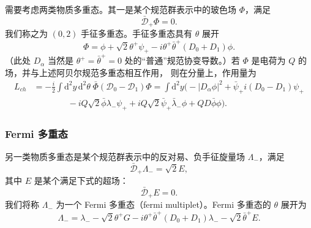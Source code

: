 需要考虑两类物质多重态。其一是某个规范群表示中的玻色场 $\Phi$，满足
\begin{equation}
\bar{\mathcal{D}}_+\Phi=0.\tag{6.10}
\end{equation}
我们称之为 $(0,2)$ 手征多重态。手征多重态具有 $\theta$ 展开
\begin{equation}
\Phi=\phi+\sqrt2\theta^+\psi_+-i\theta^+\bar\theta^+(D_0+D_1)\phi.\tag{6.11}
\end{equation}
（此处 $D_\alpha$ 当然是 $\theta^+=\bar\theta^+=0$ 处的“普通”规范协变导数。）若 $\Phi$ 是电荷为 $Q$ 的场，并与上述阿贝尔规范多重态相互作用，
\label{op:78}
则在分量上，作用量为
\begin{equation}
\begin{aligned} L_{ch} &= -\frac{i}{2}\int\mathrm{d}^2y\,\mathrm{d}^2\theta\;\bar\Phi(\mathcal{D}_0-\mathcal{D}_1)\Phi=\int\mathrm{d}^2y\Big(-|D_\alpha\phi|^2+\bar\psi_+i(D_0-D_1)\psi_+\\ &\qquad\qquad-iQ\sqrt2\bar\phi\lambda_-\psi_++iQ\sqrt2\bar\psi_+\bar\lambda_-\phi+QD\bar\phi\phi\Big). \end{aligned}\tag{6.12}
\end{equation}


\subsubsection*{Fermi 多重态}

另一类物质多重态是某个规范群表示中的反对易、负手征旋量场 $\Lambda_-$，满足
\begin{equation}
\bar{\mathcal{D}}_+\Lambda_-=\sqrt2E,\tag{6.13}
\end{equation}
其中 $E$ 是某个满足下式的超场：
\begin{equation}
\bar{\mathcal{D}}_+E=0.\tag{6.14}
\end{equation}
我们将称 $\Lambda_-$ 为一个 Fermi 多重态（fermi multiplet）。Fermi 多重态的 $\theta$ 展开为
\begin{equation}
\Lambda_-=\lambda_--\sqrt2\theta^+G-i\theta^+\bar\theta^+(D_0+D_1)\lambda_--\sqrt2\bar\theta^+E.\tag{6.15}
\end{equation}

